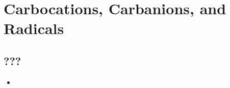 \documentclass[../notes.tex]{subfiles}
\begin{document}
\chapter{Carbocations, Carbanions, and Radicals}
\section{???}
\begin{itemize}
    \item {}
\end{itemize}
\end{document}
